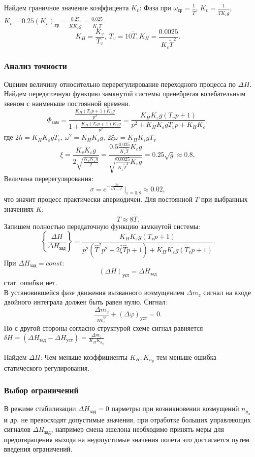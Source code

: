 \documentclass{article}
\begin{document}
Найдем граничное значение коэффицента $K_v$:
Фаза при $\omega_\text{ср} = \frac{1}{\tilde{T}} $, $K_v = \frac{1}{\tilde{T} K_\varepsilon g}$, $K_v = 0.25 (K_v)_\text{гр} = \frac{0.25}{\tilde{K}  K_\varepsilon g} = \frac{0.025}{K_\varepsilon \tilde{T}}$.
\[
	K_H = \frac{K_v}{T_v}, \ T_v = 10 \tilde{T}, K_H = \frac{0.0025}{K_\varepsilon \tilde{T}^2}
	.\]

\subsubsection{Анализ точности}
Оценим величину относительно перерегулирование переходного процесса по $\Delta H$. Найдем передаточную функцию замкнутой системы пренебрегая колебательным звеном с наименьше постоянной времени.
\[
	\Phi_\text{зам} = \frac{\frac{K_H(T_v p + 1) K_\varepsilon g}{p^2}}{1 + \frac{K_H(T_v p + 1) K_\varepsilon g}{p^2}} = \frac{K_H K_\varepsilon g(T_v p + 1)}{ p^2 +  K_H K_\varepsilon g T_v p +  K_H K_\varepsilon}
	,\]
где $2h = K_H K_\varepsilon g T_v$, $\omega^2 = K_H K_\varepsilon g$, $2 \xi \omega = K_H K_\varepsilon g T_v$
\[
	\xi = \frac{K_v K_\varepsilon g}{2 \sqrt{\frac{K_v K_\varepsilon g}{2}}} = \frac{0.5 \frac{0.025}{K_\varepsilon \tilde{T}} K_\varepsilon g}{\sqrt{\frac{0.0025}{K_\varepsilon \tilde{T}^2} K_\varepsilon  g}} = 0.25 \sqrt{g} \approx 0.8,
\]
Величина перерегулирования:
\[
	\sigma = e^{- \frac{\pi \varepsilon}{\sqrt{1 - \varepsilon^2}}} |_{\varepsilon = 0.8} \approx 0.02,
\]
что значит процесс практически апериодичен. Для постоянной $T$ при выбранных значениях $K$:
\[
	T \approx 8 \tilde{T}
	.\]
Запишем полностью передаточную функцию замкнутой системы:
\[
	\left\{ \frac{\Delta H }{\Delta H_\text{зад}} \right\}  = \frac{K_H K_\varepsilon g (T_v p + 1)}{p^2 (\hat{T}^2 p^2 + 2 \hat{\xi} \hat{T}p + 1) + K_H K_\varepsilon g (T_v p +1)}.
\]
При $\Delta H_\text{зад} = const$:
\[
	(\Delta H)_\text{уст} = \Delta H_\text{зад}
\]
стат. ошибки нет.\\
В установившейся фазе движения вызванного возмущением $ \Delta m_z $ сигнал на входе двойного интеграла должен быть равен нулю.
Сигнал:
\[
	\frac{\Delta m_z}{m_z^\varphi} + (\Delta \varphi)_\text{уст} = 0   
	.\]
Но с другой стороны согласно структурой схеме сигнал равняется $\delta H = (\Delta H_\text{зад} - \Delta H_\text{уст}) = \frac{\Delta m_z}{K_H K_{n_y}}$

Найдем $\Delta H$:
Чем меньше коэффициенты $K_H, K_{n_y}$ тем меньше ошибка статического регулирования.

\subsubsection{Выбор ограничений}
В режиме стабилизации $\Delta H_\text{зад} = 0$ парметры при возникновении возмущений $n_{y_\alpha}$ и др. не превосходят допустимые значения, при отработке больших управляющих сигналов $\Delta H_\text{зад}$, например смена эшелона необходимо принять меры для предотвращения выхода на недопустимые значения полета это достигается путем введения ограничений.    
\end{document}
